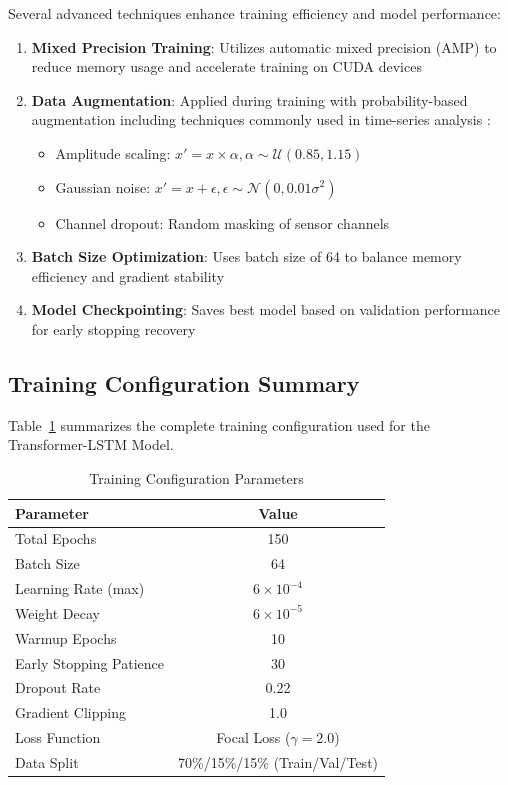 Several advanced techniques enhance training efficiency and model performance:

\begin{enumerate}
    \item \textbf{Mixed Precision Training}: Utilizes automatic mixed precision (AMP) to reduce memory usage and accelerate training on CUDA devices \citep{micikevicius2017mixed}
    
    \item \textbf{Data Augmentation}: Applied during training with probability-based augmentation including techniques commonly used in time-series analysis \citep{wen2021time}:
    \begin{itemize}
        \item Amplitude scaling: $x' = x \times \alpha, \alpha \sim \mathcal{U}(0.85, 1.15)$
        \item Gaussian noise: $x' = x + \epsilon, \epsilon \sim \mathcal{N}(0, 0.01\sigma^2)$
        \item Channel dropout: Random masking of sensor channels
    \end{itemize}
    
    \item \textbf{Batch Size Optimization}: Uses batch size of 64 to balance memory efficiency and gradient stability
    
    \item \textbf{Model Checkpointing}: Saves best model based on validation performance for early stopping recovery
\end{enumerate}

\subsection{Training Configuration Summary}
\label{subsec:training_summary}

Table~\ref{tab:training_config} summarizes the complete training configuration used for the Transformer-LSTM Model.

\begin{table}[h]
\centering
\caption{Training Configuration Parameters}
\label{tab:training_config}
\begin{tabular}{|l|c|}
\hline
\textbf{Parameter} & \textbf{Value} \\
\hline
Total Epochs & 150 \\
Batch Size & 64 \\
Learning Rate (max) & $6 \times 10^{-4}$ \\
Weight Decay & $6 \times 10^{-5}$ \\
Warmup Epochs & 10 \\
Early Stopping Patience & 30 \\
Dropout Rate & 0.22 \\
Gradient Clipping & 1.0 \\
Loss Function & Focal Loss ($\gamma=2.0$) \\
Data Split & 70\%/15\%/15\% (Train/Val/Test) \\
\hline
\end{tabular}
\end{table}

